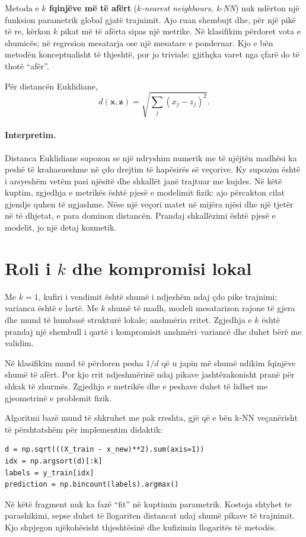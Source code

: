 \documentclass[12pt,a4paper,oneside]{book}
\newcommand{\term}[2]{\textbf{#1} (\textit{#2})}
\begin{document}
Metoda e \term{$k$ fqinjëve më të afërt}{$k$-nearest neighbours, k-NN} nuk ndërton një funksion parametrik global gjatë trajnimit. Ajo ruan shembujt dhe, për një pikë të re, kërkon $k$ pikat më të afërta sipas një metrike. Në klasifikim përdoret vota e shumicës; në regresion mesatarja ose një mesatare e ponderuar. Kjo e bën metodën konceptualisht të thjeshtë, por jo triviale: gjithçka varet nga çfarë do të thotë ``afër''.

Për distancën Euklidiane,
\[
d(\mathbf x,\mathbf z)=\sqrt{\sum_j(x_j-z_j)^2}.
\]

\paragraph{Interpretim.}
Distanca Euklidiane supozon se një ndryshim numerik me të njëjtën madhësi ka peshë të krahasueshme në çdo drejtim të hapësirës së veçorive. Ky supozim është i arsyeshëm vetëm pasi njësitë dhe shkallët janë trajtuar me kujdes. Në këtë kuptim, zgjedhja e metrikës është pjesë e modelimit fizik: ajo përcakton cilat gjendje quhen të ngjashme.
Nëse një veçori matet në mijëra njësi dhe një tjetër në të dhjetat, e para dominon distancën. Prandaj shkallëzimi është pjesë e modelit, jo një detaj kozmetik.

\section{Roli i $k$ dhe kompromisi lokal}

Me $k=1$, kufiri i vendimit është shumë i ndjeshëm ndaj çdo pike trajnimi; varianca është e lartë. Me $k$ shumë të madh, modeli mesatarizon rajone të gjera dhe mund të humbasë strukturë lokale; anshmëria rritet. Zgjedhja e $k$ është prandaj një shembull i qartë i kompromisit anshmëri--variancë dhe duhet bërë me validim.

Në klasifikim mund të përdoren pesha $1/d$ që u japin më shumë ndikim fqinjëve shumë të afërt. Por kjo rrit ndjeshmërinë ndaj pikave jashtëzakonisht pranë për shkak të zhurmës. Zgjedhja e metrikës dhe e peshave duhet të lidhet me gjeometrinë e problemit fizik.

Algoritmi bazë mund të shkruhet me pak rreshta, gjë që e bën k-NN veçanërisht të përshtatshëm për implementim didaktik:
\begin{lstlisting}[caption={Një hap i klasifikimit k-NN nga parimet e para.}]
d = np.sqrt(((X_train - x_new)**2).sum(axis=1))
idx = np.argsort(d)[:k]
labels = y_train[idx]
prediction = np.bincount(labels).argmax()
\end{lstlisting}
Në këtë fragment nuk ka fazë ``fit'' në kuptimin parametrik. Kostoja shtyhet te parashikimi, sepse duhet të llogariten distancat ndaj shumë pikave të trajnimit. Kjo shpjegon njëkohësisht thjeshtësinë dhe kufizimin llogaritës të metodës.
\end{document}
